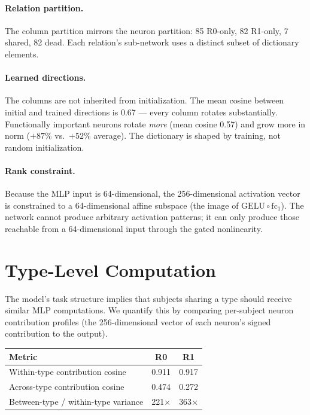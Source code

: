\documentclass[11pt,a4paper]{article}
\newcommand{\relu}{\mathrm{GELU}}
\newcommand{\fc}{\mathrm{fc}}
\begin{document}
\paragraph{Relation partition.}
The column partition mirrors the neuron partition: 85 R0-only, 82
R1-only, 7 shared, 82 dead. Each relation's sub-network uses a
distinct subset of dictionary elements.

\paragraph{Learned directions.}
The columns are not inherited from initialization. The mean cosine
between initial and trained directions is 0.67 --- every column
rotates substantially. Functionally important neurons rotate
\emph{more} (mean cosine 0.57) and grow more in norm ($+87\%$ vs.\
$+52\%$ average). The dictionary is shaped by training, not random
initialization.

\paragraph{Rank constraint.}
Because the MLP input is 64-dimensional, the 256-dimensional
activation vector is constrained to a 64-dimensional affine subspace
(the image of $\relu \circ \fc_1$). The network cannot produce
arbitrary activation patterns; it can only produce those reachable
from a 64-dimensional input through the gated nonlinearity.

\section{Type-Level Computation}
\label{sec:type_level}

The model's task structure implies that subjects sharing a type should
receive similar MLP computations. We quantify this by comparing
per-subject neuron contribution profiles (the 256-dimensional vector
of each neuron's signed contribution to the output).

\begin{table}[h]
\centering
\begin{tabular}{lcc}
\toprule
Metric & R0 & R1 \\
\midrule
Within-type contribution cosine & 0.911 & 0.917 \\
Across-type contribution cosine & 0.474 & 0.272 \\
Between-type / within-type variance & 221$\times$ & 363$\times$ \\
\bottomrule
\end{tabular}
\end{table}
\end{document}
